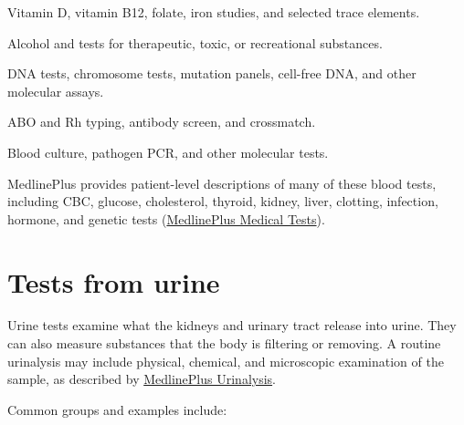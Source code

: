 \documentclass[11pt,openany]{book}
\begin{document}
\begin{description}[leftmargin=3.2cm,style=nextline]
  \item[Nutrition] Vitamin D, vitamin B12, folate, iron studies, and selected trace elements.
  \item[Toxicology and medicines] Alcohol and tests for therapeutic, toxic, or recreational substances.
  \item[Genetic and molecular tests] DNA tests, chromosome tests, mutation panels, cell-free DNA, and other molecular assays.
  \item[Blood banking] ABO and Rh typing, antibody screen, and crossmatch.
  \item[Microbiology] Blood culture, pathogen PCR, and other molecular tests.
\end{description}

MedlinePlus provides patient-level descriptions of many of these blood tests,
including CBC, glucose, cholesterol, thyroid, kidney, liver, clotting,
infection, hormone, and genetic tests (\href{https://medlineplus.gov/lab-tests/}{MedlinePlus Medical Tests}).

\section{Tests from urine}

Urine tests examine what the kidneys and urinary tract release into urine. They
can also measure substances that the body is filtering or removing. A routine
urinalysis may include physical, chemical, and microscopic examination of the
sample, as described by \href{https://medlineplus.gov/ency/article/003579.htm}{MedlinePlus Urinalysis}.

Common groups and examples include:
\end{document}
